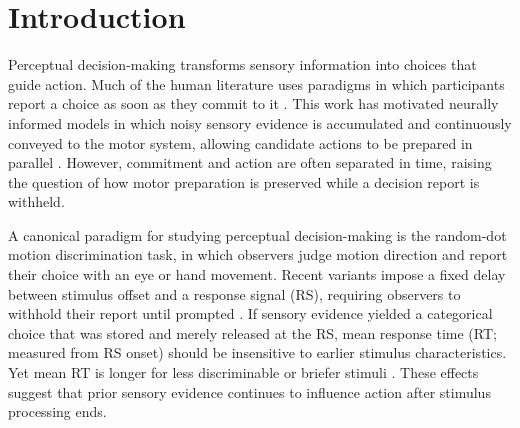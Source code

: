 \documentclass[a4paper,11pt]{article}
\theoremstyle{definition}
\newcommand{\1}{\mathbbm{1}}
\begin{document}
\section{Introduction}

Perceptual decision-making transforms sensory information into choices that guide action. Much of the human literature uses paradigms in which participants report a choice as soon as they commit to it \parencites{forstmannSequentialSamplingModels2016}{oconnellNeurophysiologyHumanPerceptual2021}. This work has motivated neurally informed models in which noisy sensory evidence is accumulated and continuously conveyed to the motor system, allowing candidate actions to be prepared in parallel \parencites{balsdonSecondaryMotorIntegration2023}{dendauwGatedCascadeDiffusion2024}{kellyNeurocomputationalMechanismsPriorinformed2021}. However, commitment and action are often separated in time, raising the question of how motor preparation is preserved while a decision report is withheld.

A canonical paradigm for studying perceptual decision-making is the random-dot motion discrimination task, in which observers judge motion direction and report their choice with an eye or hand movement. Recent variants impose a fixed delay between stimulus offset and a response signal (RS), requiring observers to withhold their report until prompted \parencites{achardExtendingContinuousFlow2025}{roggeMotorCorticalSignals2022}. If sensory evidence yielded a categorical choice that was stored and merely released at the RS, mean response time (RT; measured from RS onset) should be insensitive to earlier stimulus characteristics. Yet mean RT is longer for less discriminable or briefer stimuli \parencite{achardExtendingContinuousFlow2025}. These effects suggest that prior sensory evidence continues to influence action after stimulus processing ends.
\end{document}
